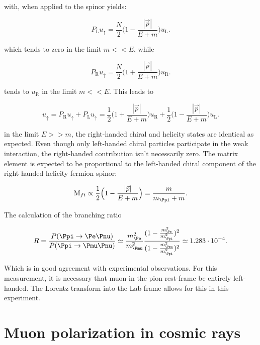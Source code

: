 with, when applied to the spinor yields:

\begin{equation}
P_{\text{L}}u_{\uparrow}=\frac{N}{2}\Big(1-\frac{|\vec{p}|}{E+m}\Big)u_{\text{L}}.
\end{equation} 

which tends to zero in the limit $m<<E$, while

\begin{equation}
P_{\text{R}}u_{\uparrow}=\frac{N}{2}\Big(1+\frac{|\vec{p}|}{E+m}\Big)u_{\text{R}}.
\end{equation}

tends to $u_{\text{R}}$ in the limit $m<<E$. This leads to

\begin{equation}
u_{\uparrow}=P_{\text{R}}u_{\uparrow} + P_{\text{L}}u_{\uparrow} = \frac{1}{2}\Big(1+\frac{|\vec{p}|}{E+m}\Big)u_{\text{R}} + \frac{1}{2}\Big(1-\frac{|\vec{p}|}{E+m}\Big)u_{\text{L}}.
\end{equation}

in the limit $E>>m$, the right-handed chiral and helicity states are identical as expected. Even though only left-handed chiral particles participate in the weak interaction, the right-handed contribution isn't necessarily zero. The matrix element is expected to be proportional to the left-handed chiral component of the right-handed helicity fermion spinor:

\begin{equation}
\text{M}_{fi} \propto \frac{1}{2} \Big(1-\frac{|\vec{p}|}{E+m}\Big) = \frac{m}{m_{\Ppi}+m} .
\end{equation}

The calculation of the branching ratio

\begin{equation}
R=\frac{P(\Ppi\rightarrow \Pe \Pnu)}{P(\Ppi\rightarrow \Pmu\Pnu)}\simeq \frac{m_{\Pe}^2}{m_{\Pmu}^2}\frac{(1-\frac{m_{\Pe}^2}{m_{\Ppi}^2})^2}{(1-\frac{m_{\Pmu}^2}{m_{\Ppi}^2})^2} \simeq 1.283 \cdot 10^{-4}.
\end{equation}

Which is in good agreement with experimental observations. For this measurement, it is necessary that muon in the pion rest-frame be entirely left-handed. The Lorentz transform into the Lab-frame allows for this in this experiment.

\section{Muon polarization in cosmic rays}

